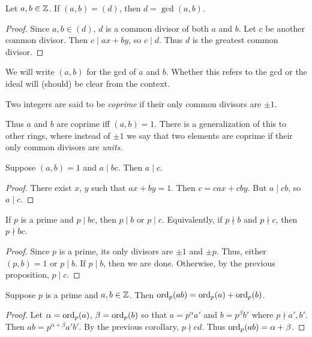 \begin{corollary}
    Let $a, b \in \mathbb{Z}$.
    If $(a, b) = (d)$, then $d = \gcd(a, b)$.
\end{corollary}
\begin{proof}
    Since $a, b \in (d)$, $d$ is a common divisor of both $a$
    and $b$.
    Let $c$ be another common divisor.
    Then $c \mid ax + by$, so $c \mid d$.
    Thus $d$ is the greatest common divisor.
\end{proof}

\begin{notation}
    We will write $(a, b)$ for the gcd of $a$ and $b$.
    Whether this refers to the gcd or the ideal will (should) be clear
    from the context.
\end{notation}
\begin{definition}[Coprime] \label{def:coprime}
    Two integers are said to be \emph{coprime} if their only common divisors
    are $\pm 1$.
\end{definition}
Thus $a$ and $b$ are coprime iff $(a, b) = 1$.
There is a generalization of this to other rings,
where instead of $\pm 1$ we say that two elements are coprime if
their only common divisors are \emph{units}.

\begin{proposition}
    Suppose $(a, b) = 1$ and $a \mid bc$.
    Then $a \mid c$.
\end{proposition}
\begin{proof}
    There exist $x$, $y$ such that $ax + by = 1$.
    Then $c = cax + cby$.
    But $a \mid cb$, so $a \mid c$.
\end{proof}

\begin{corollary}
    If $p$ is a prime and $p \mid bc$, then $p \mid b$ or $p \mid c$.
    Equivalently, if $p \nmid b$ and $p \nmid c$, then $p \nmid bc$.
\end{corollary}
\begin{proof}
    Since $p$ is a prime, its only divisors are $\pm 1$ and $\pm p$.
    Thus, either $(p, b) = 1$ or $p \mid b$.
    If $p \mid b$, then we are done.
    Otherwise, by the previous proposition, $p \mid c$.
\end{proof}

\begin{corollary} \label{thm:order_of_product}
    Suppose $p$ is a prime and $a, b \in \mathbb{Z}$.
    Then $\operatorname{ord}_p(ab) = \operatorname{ord}_p(a) + \operatorname{ord}_p(b)$.
\end{corollary}
\begin{proof}
    Let $\alpha = \operatorname{ord}_p(a)$, $\beta = \operatorname{ord}_p(b)$ so that
    $a = p^\alpha a'$ and $b = p^\beta b'$ where $p \nmid a', b'$.
    Then $ab = p^{\alpha + \beta} a' b'$.
    By the previous corollary, $p \nmid cd$.
    Thus $\operatorname{ord}_p(ab) = \alpha + \beta$.
\end{proof}

